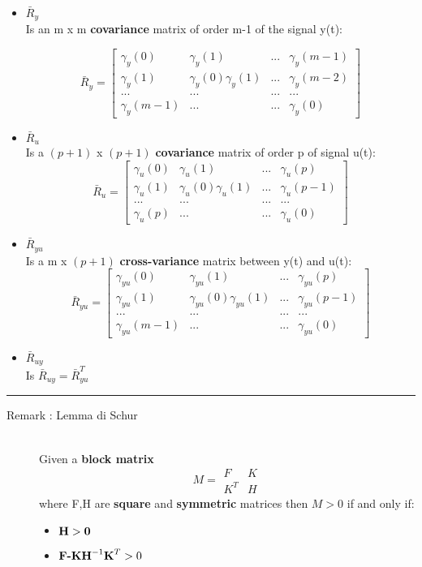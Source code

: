 \begin{itemize}
\item $\bar{R}_y$\\
Is an m x m \textbf{covariance} matrix of order m-1 of the signal y(t):

$$
\bar{R}_y = 
	\begin{bmatrix}
       \gamma_{y}(0) & \gamma_y(1) & ... & \gamma_y(m-1)        \\[0.3em]
       \gamma_y(1) & \gamma_y(0)\gamma_y(1) &...& \gamma_y(m-2) \\[0.3em]
       ... & ... & ... 	& ...								   \\[0.3em]
       \gamma_y(m-1) & ... & ... & \gamma_y(0)
     \end{bmatrix} 
$$

\item $\bar{R}_{u}$\\
Is a $(p+1)$ x $(p+1)$ \textbf{covariance } matrix of order p of signal u(t):
$$
\bar{R}_{u} = 
	\begin{bmatrix}
       \gamma_{u}(0) & \gamma_{u}(1) & ... & \gamma_{u}(p)        \\[0.3em]
       \gamma_{u}(1) & \gamma_{u}(0)\gamma_{u}(1) &...& \gamma_{u}(p-1) \\[0.3em]
       ... & ... & ... 	& ...								   \\[0.3em]
       \gamma_{u}(p) & ... & ... & \gamma_{u}(0)
     \end{bmatrix} 
$$

\item $\bar{R}_{yu}$\\
Is a m x $(p+1)$ \textbf{cross-variance} matrix between y(t) and u(t):
$$
\bar{R}_{yu} = 
	\begin{bmatrix}
       \gamma_{yu}(0) & \gamma_{yu}(1) & ... & \gamma_{yu}(p)        \\[0.3em]
       \gamma_{yu}(1) & \gamma_{yu}(0)\gamma_{yu}(1) &...& \gamma_{yu}(p-1) \\[0.3em]
       ... & ... & ... 	& ...								   \\[0.3em]
       \gamma_{yu}(m-1) & ... & ... & \gamma_{yu}(0)
     \end{bmatrix} 
$$
\item $\bar{R}_{u y}$\\
Is $\bar{R}_{u y} = \bar{R}_{yu}^T$
\end{itemize}
\par\noindent\rule{\textwidth}{0.4pt}
\begin{description}
\item[Remark : Lemma di Schur]\hfill\\
Given a \textbf{block matrix}  
$$ M= 
\begin{array}{c|c}
  F & K \\ 
  \hline
  K^T & H
 \end{array}$$
 where F,H are \textbf{square} and \textbf{symmetric} matrices then $M>0$ if and only if:
\begin{itemize}
\item $ \text{\textbf{H}} > \text{\textbf{0}}$
\item $\text{\textbf{F-KH}}^{-1}\text{\textbf{K}}^T > 0$
\end{itemize}
\end{description}
